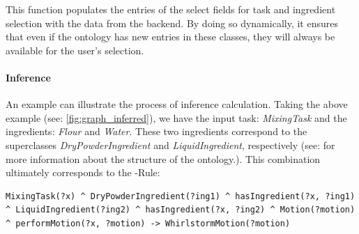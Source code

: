 This function populates the entries of the select fields for task and ingredient selection with the data from the backend. 
By doing so dynamically, it ensures that even if the ontology has new entries in these classes, they will always be available for the user's selection.

\paragraph*{Inference}
\label{par:Inference}

An example can illustrate the process of inference calculation. Taking the above example (see: \ref{fig:graph_inferred}), we have the input task: \textit{MixingTask} and the ingredients: \textit{Flour} and \textit{Water}. 
These two ingredients correspond to the superclasses \textit{DryPowderIngredient} and \textit{LiquidIngredient}, respectively (see:  for more information 
about the structure of the ontology.). This combination ultimately corresponds to the -Rule:
\begin{lstlisting}
MixingTask(?x) ^ DryPowderIngredient(?ing1) ^ hasIngredient(?x, ?ing1)
^ LiquidIngredient(?ing2) ^ hasIngredient(?x, ?ing2) ^ Motion(?motion) 
^ performMotion(?x, ?motion) -> WhirlstormMotion(?motion)
\end{lstlisting}

